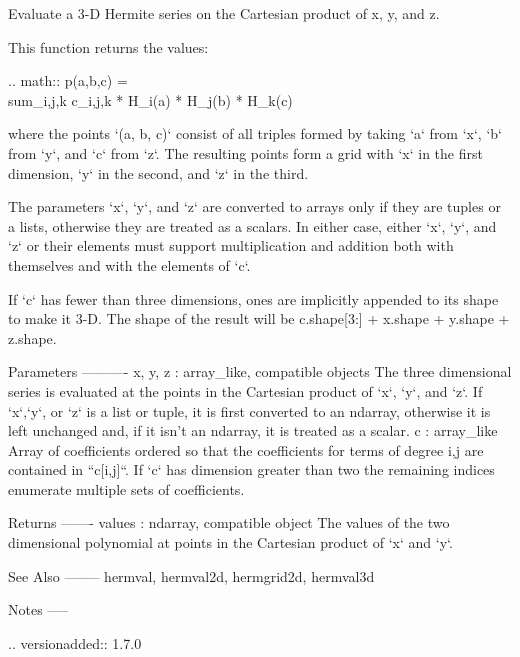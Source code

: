 \begin{DoxyVerb}Evaluate a 3-D Hermite series on the Cartesian product of x, y, and z.

This function returns the values:

.. math:: p(a,b,c) = \\sum_{i,j,k} c_{i,j,k} * H_i(a) * H_j(b) * H_k(c)

where the points `(a, b, c)` consist of all triples formed by taking
`a` from `x`, `b` from `y`, and `c` from `z`. The resulting points form
a grid with `x` in the first dimension, `y` in the second, and `z` in
the third.

The parameters `x`, `y`, and `z` are converted to arrays only if they
are tuples or a lists, otherwise they are treated as a scalars. In
either case, either `x`, `y`, and `z` or their elements must support
multiplication and addition both with themselves and with the elements
of `c`.

If `c` has fewer than three dimensions, ones are implicitly appended to
its shape to make it 3-D. The shape of the result will be c.shape[3:] +
x.shape + y.shape + z.shape.

Parameters
----------
x, y, z : array_like, compatible objects
    The three dimensional series is evaluated at the points in the
    Cartesian product of `x`, `y`, and `z`.  If `x`,`y`, or `z` is a
    list or tuple, it is first converted to an ndarray, otherwise it is
    left unchanged and, if it isn't an ndarray, it is treated as a
    scalar.
c : array_like
    Array of coefficients ordered so that the coefficients for terms of
    degree i,j are contained in ``c[i,j]``. If `c` has dimension
    greater than two the remaining indices enumerate multiple sets of
    coefficients.

Returns
-------
values : ndarray, compatible object
    The values of the two dimensional polynomial at points in the Cartesian
    product of `x` and `y`.

See Also
--------
hermval, hermval2d, hermgrid2d, hermval3d

Notes
-----

.. versionadded:: 1.7.0\end{DoxyVerb}
 \mbox{\label{namespacenumpy_1_1polynomial_1_1hermite_a433a3f34578b90256486c532d2fd8210}} 
